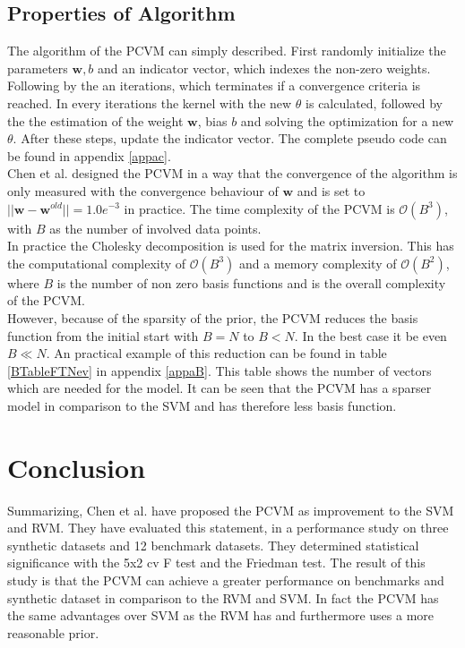 \subsection{Properties of Algorithm}\label{PcSubSecAlgo}
The algorithm of the \acs{PCVM} can simply described.
First randomly initialize the parameters $\mathbf{w},b$ and an indicator vector, which indexes the non-zero weights.
Following by the an iterations, which terminates if a convergence criteria is reached. 
In every iterations the kernel with the new $\theta$ is calculated, followed by the the estimation of the weight $\mathbf{w}$, bias $b$ and solving the optimization for a new $\theta$. After these steps, update the indicator vector.\cite{Chen.2009}
The complete pseudo code can be found in appendix \ref{appac}.\\
Chen et al. designed the \acs{PCVM} in a way that the convergence of the algorithm is only measured with the convergence behaviour of $\mathbf{w}$ and is set to $||{\mathbf{w}-\mathbf{w}^{old}}|| = 1.0e^{-3}$ in practice. 
The time complexity of the \acs{PCVM} is $\mathcal{O}(B^3)$, with $B$ as the number of involved data points.\\
In practice the Cholesky decomposition is used for the matrix inversion. 
This has the computational complexity of $\mathcal{O}(B^3)$ and a memory complexity of $\mathcal{O}(B^2)$, where $B$ is the number of non zero basis functions and is the overall complexity of the \acs{PCVM}.\cite{Chen.2009}\\
However, because of the sparsity of the prior, the \acs{PCVM} reduces the basis function from the initial start with $B = N$ to $B < N$.
In the best case it be even $B \ll N$.
An practical example of this reduction can be found in table \ref{BTableFTNev} in appendix \ref{appaB}. 
This table shows the number of vectors which are needed for the model. 
It can be seen that the \acs{PCVM} has a sparser model in comparison to the \acs{SVM} and has therefore less basis function.

\section{Conclusion}
Summarizing, Chen et al. have proposed the \acs{PCVM} as improvement to the \acs{SVM} and \acs{RVM}.
They have evaluated this statement, in a performance study on three synthetic datasets and 12 benchmark datasets.
They determined statistical significance with the 5x2 cv F test and the Friedman test.
The result of this study is that the \acs{PCVM} can achieve a greater performance on benchmarks and synthetic dataset in comparison to the \acs{RVM} and \acs{SVM}.
In fact the \acs{PCVM} has the same advantages over \ac{SVM} as the \acs{RVM} has and furthermore uses a more reasonable prior.\cite{Chen.2009}

